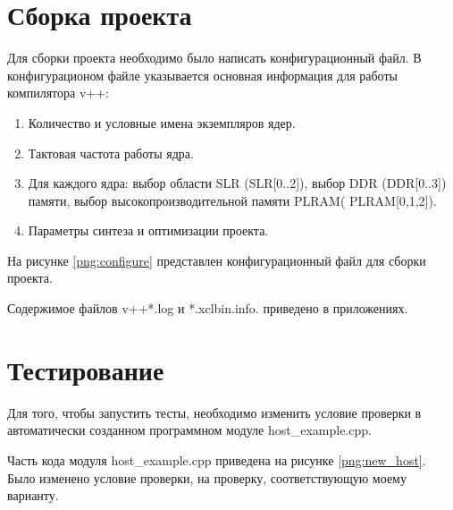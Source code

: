 \chapter*{Сборка проекта}

Для сборки проекта необходимо было написать конфигурационный файл. В конфигурационом файле указывается основная информация для работы компилятора v++:

\begin{enumerate}
	\item Количество и условные имена экземпляров ядер.
	\item Тактовая частота работы ядра.
	\item Для каждого ядра: выбор области SLR (SLR[0..2]), выбор DDR (DDR[0..3]) памяти, выбор высокопроизводительной памяти PLRAM( PLRAM[0,1,2]).
	\item Параметры синтеза и оптимизации проекта.
\end{enumerate}

На рисунке \ref{png:configure} представлен конфигурационный файл для сборки проекта.

\begin{figure}[H]
	\captionsetup{justification=centering}
\end{figure}
Содержимое файлов v++*.log и *.xclbin.info. приведено в приложениях.

\chapter*{Тестирование}

Для того, чтобы запустить тесты, необходимо изменить условие проверки в автоматически созданном программном модуле host\_example.cpp.

Часть кода модуля host\_example.cpp приведена на рисунке \ref{png:new_host}. Было изменено условие проверки, на проверку, соответствующую моему варианту.

